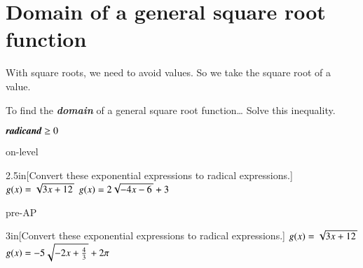 \newpage
\section{Domain of a general square root function}

With square roots, we need to avoid  values. 
So we  take the square root of a  value.

\begin{myConcept}{To find the {\bfseries\itshape domain} of a general square root function\dots}
    Solve this inequality.
    \begin{myCenteredBox}[width=2in]
        \centering\LARGE 
        $ \text{\itshape\bfseries radicand} \geq 0 $ 
    \end{myCenteredBox}
\end{myConcept}




\begin{taggedblock}{on-level}
    \begin{my2Problems}{2.5in}[Convert these exponential expressions to radical expressions.]
        {
            $ g(x) = \myRoot{3x + 12}$ 
        }
        {
            $ g(x) = 2\myRoot{-4x - 6} + 3$ 
        }
    \end{my2Problems}
\end{taggedblock}

\begin{taggedblock}{pre-AP}
    \begin{my2Problems}{3in}[Convert these exponential expressions to radical expressions.]
        {
            $ g(x) = \myRoot{3x + 12}$ 
        }
        {
            $ g(x) = -5\myRoot{-2x + \frac{4}{3}} + 2\pi$ 
        }
    \end{my2Problems}
\end{taggedblock}